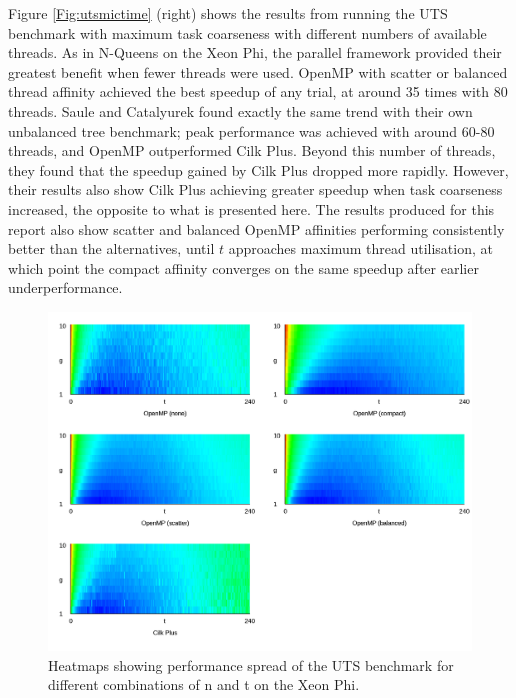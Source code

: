\documentclass{report}
\begin{document}
Figure \ref{Fig:utsmictime} (right) shows the results from running the UTS benchmark with maximum task coarseness with different numbers of available threads. As in N-Queens on the Xeon Phi, the parallel framework provided their greatest benefit when fewer threads were used. OpenMP with scatter or balanced thread affinity achieved the best speedup of any trial, at around 35 times with 80 threads. Saule and Catalyurek\cite{Saule12} found exactly the same trend with their own unbalanced tree benchmark; peak performance was achieved with around 60-80 threads, and OpenMP outperformed Cilk Plus. Beyond this number of threads, they found that the speedup gained by Cilk Plus dropped more rapidly. However, their results also show Cilk Plus achieving greater speedup when task coarseness increased, the opposite to what is presented here. The results produced for this  report also show scatter and balanced OpenMP affinities performing consistently better than the alternatives, until \(t\) approaches maximum thread utilisation, at which point the compact affinity converges on the same speedup after earlier underperformance.
\noindent
\begin{figure}[t!]
	\includegraphics[width=\linewidth]{../../heatmaps/mic/uts}
	\caption{Heatmaps showing performance spread of the UTS benchmark for different combinations of n and t on the Xeon Phi.}
	\label{Fig:utsmicheatmap}
\end{figure}
\end{document}
